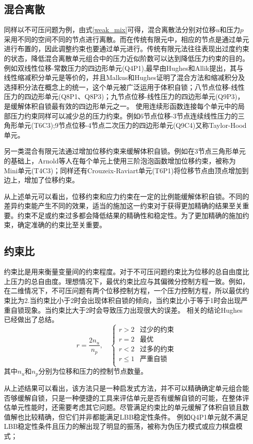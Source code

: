 \subsection{混合离散}
同样以不可压问题为例，由式\eqref{weak_mix}可得，混合离散法分别对位移$u$和压力$p$采用不同的空间不同的节点进行离散。而在传统有限元中，相应的节点是通过单元进行布置的，因此调整约束也要通过单元进行。传统有限元法往往表现出过度约束的状态，降低混合离散单元组合中的压力近似阶数可以达到降低压力约束的目的。
例如双线性位移-常数压力的四边形单元(Q4P1),最早由Hughes和Allik提出\cite{hughes1969}，其与线性缩减积分单元是等价的，并且Malkus和Hughes证明了混合方法和缩减积分及选择积分法在概念上的统一\cite{hughes1978}，这个单元被广泛运用于体积自锁；八节点位移-线性压力的四边形单元(Q8P1、Q8P3)；九节点位移-线性压力的四边形单元(Q9P3)，是缓解体积自锁最有效的四边形单元之一。
使用连续形函数连接每个单元中的局部压力约束同样可以减少总的压力约束。例如6节点位移-3节点连续线性压力的三角形单元(T6C3);9节点位移-4节点二次压力的四边形单元(Q9C4)又称Taylor-Hood单元。

另一类混合有限元法通过增加位移约束来缓解体积自锁。例如在3节点三角形单元的基础上，Arnold等人在每个单元上使用三阶泡泡函数增加位移约束，被称为Mini单元(T4C3)；同样还有Crouzeix-Raviart单元(T6P1)将位移节点由顶点增加到边上，增加了位移约束。

从上述单元可以看出，位移约束和应力约束在一定的比例能缓解体积自锁。不同的差异约束能产生不同的效果，适当的施加这一约束对于获得更加精确的结果至关重要。约束不足或约束过多都会降低结果的精确性和稳定性。为了更加精确的施加约束，确定准确的约束比至关重要。
\subsection{约束比}
约束比是用来衡量变量间的约束程度。对于不可压问题约束比为位移的总自由度比上压力的总自由度。理想情况下，最优约束比应与其偏微分控制方程一致。例如，在二维情况下，不可压问题有两个位移控制方程，一个压力控制方程，所以最优约束比为2.当约束比小于2时会出现体积自锁的倾向，当约束比小于等于1时会出现严重自锁现象。当约束比大于2时会导致压力出现很大的误差。
相关的结论Hughes已经做出了总结\cite{hughes2000}。
\begin{equation}
    r = \frac{2n_u}{n_p}, \quad 
    \begin{cases}
        r > 2 & \text{过少的约束} \\
        r = 2 & \text{最优} \\
        r < 2 & \text{过多的约束} \\
        r \le 1 & \text{严重自锁} \\
    \end{cases}
\end{equation}
其中$n_u$和$n_p$分别为位移和压力的控制节点数量。


从上述结果可以看出，该方法只是一种启发式方法，并不可以精确确定单元组合能否够缓解自锁，只是一种便捷的工具来评估单元是否有缓解自锁的可能，在整体评估单元性能时，还需要考虑其它问题。尽管满足约束比的单元缓解了体积自锁且数值解也比较精确，但它们并非都能满足LBB稳定性条件。
例如Q4P1单元就不满足LBB稳定性条件且压力的解出现了明显的振荡，被称为伪压力模式或应力棋盘模式；

